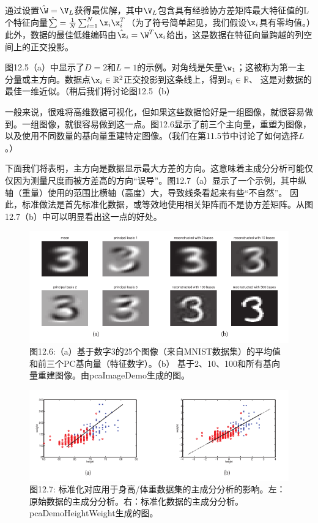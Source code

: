 \documentclass[a4paper]{article}
\begin{document}
通过设置$\hat{\W}=\V_L$获得最优解，其中$\V_L$包含具有经验协方差矩阵最大特征值的L个特征向量$\hat{\textstyle \sum}=\frac{1}{N}\sum\nolimits_{i=1}^N\x_i\x_i^T$（为了符号简单起见，我们假设$\x_i$具有零均值。）此外，数据的最佳低维编码由$\hat{\z}_i=\W^T\x_i$给出，这是数据在特征向量跨越的列空间上的正交投影。

图12.5（a）中显示了$D=2$和$L=1$的示例。对角线是矢量$\w_1$；这被称为第一主分量或主方向。数据点$\x_i\in\mathbb{R}^2$正交投影到这条线上，得到$z_i\in\mathbb{R}$、 这是对数据的最佳一维近似。（稍后我们将讨论图12.5（b） 

一般来说，很难将高维数据可视化，但如果这些数据恰好是一组图像，就很容易做到。一组图像，就很容易做到这一点。图12.6显示了前三个主向量，重塑为图像，以及使用不同数量的基向量重建特定图像。（我们在第11.5节中讨论了如何选择$L$。） 

下面我们将表明，主方向是数据显示最大方差的方向。这意味着主成分分析可能仅仅因为测量尺度而被方差高的方向“误导”。图12.7（a）显示了一个示例，其中纵轴（重量）使用的范围比横轴（高度）大，导致线条看起来有些“不自然”。 因此，标准做法是首先标准化数据，或等效地使用相关矩阵而不是协方差矩阵。从图12.7（b）中可以明显看出这一点的好处。 

\begin{figure}[h]
	\centering
	\includegraphics[width=1\linewidth]{fig/figure6}
	\caption*{图12.6:（a）基于数字3的25个图像（来自MNIST数据集）的平均值和前三个PC基向量（特征数字）。（b） 基于2、10、100和所有基向量重建图像。由pcaImageDemo生成的图。 }
\end{figure}

\clearpage
\begin{figure}[h]
	\centering
	\includegraphics[width=1\linewidth]{fig/figure7}
	\caption*{图12.7: 标准化对应用于身高/体重数据集的主成分分析的影响。左：原始数据的主成分分析。右：标准化数据的主成分分析。pcaDemoHeightWeight生成的图。 }
\end{figure}
\end{document}
